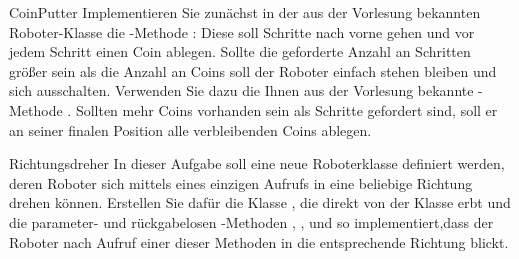 \documentclass{../tuda-exercise}
\begin{document}
  \begin{task}[credit=\stars{1}{3}]{CoinPutter}
    Implementieren Sie zunächst in der aus der Vorlesung bekannten Roboter-Klasse
     die -Methode : Diese soll  Schritte nach vorne gehen und vor jedem
    Schritt einen Coin ablegen. Sollte die geforderte Anzahl an Schritten größer sein als die
    Anzahl an Coins soll der Roboter einfach stehen bleiben und sich ausschalten. Verwenden Sie
    dazu die Ihnen aus der Vorlesung bekannte -Methode . Sollten mehr Coins vorhanden sein als Schritte gefordert sind, soll er an seiner
    finalen Position alle verbleibenden Coins ablegen.

    \clearpagesolution

    \begin{solution}
      
    \end{solution}
  \end{task}

  \clearpagesolution

  \begin{task}[credit=\stars{1}{3}]{Richtungsdreher}
    In dieser Aufgabe soll eine neue Roboterklasse definiert werden, deren Roboter sich mittels
    eines einzigen Aufrufs in eine beliebige Richtung drehen können. Erstellen Sie dafür die
    Klasse , die direkt von der Klasse  erbt und
    die parameter- und rückgabelosen -Methoden ,
    ,  und  so implementiert,dass
    der Roboter nach Aufruf einer dieser Methoden in die entsprechende Richtung blickt.

    \clearpagesolution

    \begin{solution}
      
    \end{solution}
  \end{task}
\end{document}
